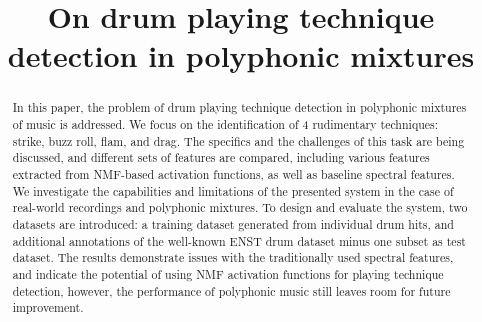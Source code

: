 \documentclass{article}
\title{On drum playing technique detection in polyphonic mixtures}
\begin{document}
%
\maketitle
%
\begin{abstract}

In this paper, the problem of drum playing technique detection in polyphonic mixtures of music is addressed. We focus on the identification of 4 rudimentary techniques: strike, buzz roll, flam, and drag. The specifics and the challenges of this task are being discussed, and different sets of features are compared, including various features extracted from NMF-based activation functions, as well as baseline spectral features. We investigate the capabilities and limitations of
the presented system in the case of real-world recordings and polyphonic mixtures. To design and evaluate the system, two datasets are introduced: a training dataset generated from individual drum hits, and additional annotations of the well-known ENST drum dataset minus one subset as test dataset. The results demonstrate issues with the traditionally used spectral features, and indicate the potential of using NMF activation functions for playing technique detection, however, the performance of polyphonic music still leaves room for future improvement.
\end{abstract}
\end{document}
